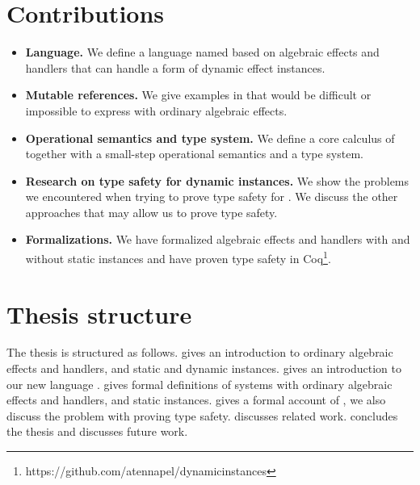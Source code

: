 \section*{Contributions}
\begin{itemize}

\item \textbf{Language.}
We define a language named \lang{} based on algebraic effects and handlers that can handle a form of dynamic effect instances.

\item \textbf{Mutable references.}
We give examples in \lang{} that would be difficult or impossible to express with ordinary algebraic effects.

\item \textbf{Operational semantics and type system.}
We define a core calculus of \lang{} together with a small-step operational semantics and a type system.

\item \textbf{Research on type safety for dynamic instances.}
We show the problems we encountered when trying to prove type safety for \lang{}.
We discuss the other approaches that may allow us to prove type safety.

\item \textbf{Formalizations.}
We have formalized algebraic effects and handlers with and without static instances and have proven type safety in Coq\footnote{https://github.com/atennapel/dynamicinstances}.

\end{itemize}

\section*{Thesis structure}
The thesis is structured as follows.
 gives an introduction to ordinary algebraic effects and handlers, and static and dynamic instances.
 gives an introduction to our new language \lang{}.
 gives formal definitions of systems with ordinary algebraic effects and handlers, and static instances.
 gives a formal account of \lang{}, we also discuss the problem with proving type safety.
 discusses related work.
 concludes the thesis and discusses future work.
